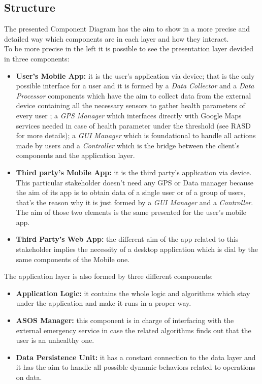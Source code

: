 \subsection{Structure}
The presented Component Diagram has the aim to show in a more precise and detailed way which components are in each layer and how they interact.\\
To be more precise in the left it is possible to see the presentation layer devided in three components:
\begin{itemize}
	\item \textbf {User's Mobile App:} it is the user's application via device; that is the only possible interface for a user and it is 			formed by a \textit {Data Collector} and a \textit {Data Processor} components which have the aim to collect data from the 			external device containing all the necessary sensors to gather health parameters of every user ; a \textit {GPS Manager} 			which interfaces directly with Google Maps services needed in case of health parameter under the threshold (see RASD for 			more details); a \textit {GUI Manager} which is foundational to handle all actions made by users and a \textit {Controller} 			which is the bridge between the client's components and the application layer.
	\item \textbf {Third party's Mobile App:} it is the third party's application via device. This particular stakeholder doesn't need 			any GPS or Data manager because the aim of its app is to obtain data  of a single user or of a group of users, that's the 			reason why it is just formed by a \textit{ GUI Manager} and a \textit {Controller}. The aim of those two elements is the same 			presented for the user's mobile app.
	\item \textbf {Third Party's Web App:} the different aim of the app related to this stakeholder implies the necessity of a 			desktop application which is dial by the same components of the Mobile one.
\end{itemize}The application layer is also formed by three different components:
\begin{itemize}
	\item \textbf{Application Logic:} it contains the whole logic and algorithms which stay under the application and make it runs in 			a proper way.
	\item \textbf{ ASOS Manager:} this component is in charge of interfacing with the external emergency service in case the 			related algorithms finds out that the user is an unhealthy one.
	\item \textbf{Data Persistence Unit:} it has a constant connection to the data layer and it has the aim to handle all possible 			dynamic behaviors related to operations on data.
\end{itemize}
